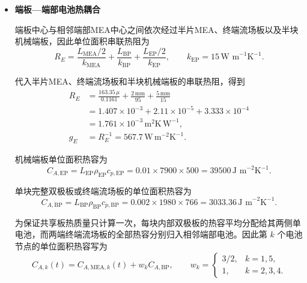 \documentclass[bwprint]{gmcmthesis}
\numberwithin{equation}{section}
\numberwithin{figure}{section}
\begin{document}
\begin{itemize}
 这样既保留了问题一含水、含冰状态对材料热物性的动态影响，也保证同一片间边的传热功率在相邻两节点之间等量反向出现。


\item \textbf {端板—端部电池热耦合}

 端板中心与相邻端部MEA中心之间依次经过半片MEA、终端流场板以及半块机械端板，因此单位面积串联热阻为
\begin{equation}
R_E = \frac{L_{\text{MEA}}/2}{k_{\text{MEA}}} + \frac{L_{\text{BP}}}{k_{\text{BP}}} + \frac{L_{\text{EP}}/2}{k_{\text{EP}}}, \qquad k_{\text{EP}} = 15 \, \text{W m}^{-1}\text{K}^{-1}. \label{eq:src:5-15}
\end{equation}

 代入半片MEA、终端流场板和半块机械端板的串联热阻，得到
\begin{align}
R_E&=\frac{163.35\,\mu}{0.1161}+\frac{2\,\mathrm{mm}}{95}+\frac{5\,\mathrm{mm}}{15}\nonumber\\
&=1.407\times10^{-3}+2.11\times10^{-5}+3.333\times10^{-4}\nonumber\\
&=1.761\times10^{-3}\,\mathrm{m^2K\,W^{-1}},\label{eq:src:5-16}\\
g_E&=R_E^{-1}=567.7\,\mathrm{W\,m^{-2}K^{-1}}.\label{eq:src:5-17}
\end{align}

 机械端板单位面积热容为
\begin{equation}
C_{A,\text{EP}} = L_{\text{EP}} \rho_{\text{EP}} c_{p,\text{EP}} = 0.01 \times 7900 \times 500 = 39500 \, \text{J m}^{-2}\text{K}^{-1}. \label{eq:src:5-18}
\end{equation}

 单块完整双极板或终端流场板的单位面积热容为
\begin{equation}
C_{A,\text{BP}} = L_{\text{BP}} \rho_{\text{BP}} c_{p,\text{BP}} = 0.002 \times 1980 \times 766 = 3033.36 \, \text{J m}^{-2}\text{K}^{-1}. \label{eq:src:5-19}
\end{equation}

 为保证共享板热质量只计算一次，每块内部双极板的热容平均分配给其两侧单电池，而两端终端流场板的全部热容分别归入相邻端部电池。因此第 \(k\) 个电池节点的单位面积热容写为
\begin{equation}
C_{A,k}(t) = C_{A,\text{MEA},k}(t) + w_k C_{A,\text{BP}}, \qquad w_k = \begin{cases} 3/2, & k = 1, 5, \\ 1, & k = 2, 3, 4. \end{cases} \label{eq:src:5-20}
\end{equation}


\end{itemize}
\end{document}
